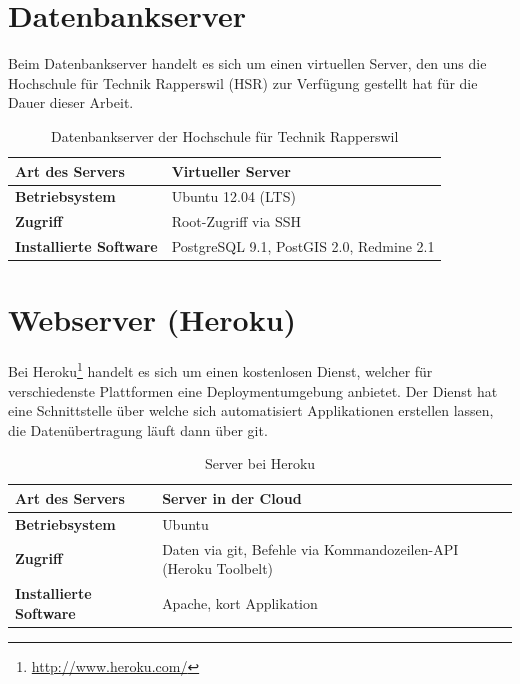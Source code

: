\section{Datenbankserver}

Beim Datenbankserver handelt es sich um einen virtuellen Server, den uns die Hochschule für Technik Rapperswil (HSR) zur Verfügung gestellt hat für die Dauer dieser Arbeit.

\begin{table}[H]
\centering
\begin{tabular}{|p{0.25\twocelltabwidth}|p{0.75\twocelltabwidth}|}
\hline 
\textbf{Art des Servers} & Virtueller Server \\
\hline 
\textbf{Betriebsystem} & Ubuntu 12.04 (LTS) \\
\hline 
\textbf{Zugriff} & Root-Zugriff via SSH \\
\hline 
\textbf{Installierte Software} & PostgreSQL 9.1, PostGIS 2.0, Redmine 2.1 \\
\hline 
\end{tabular} 
\caption{Datenbankserver der Hochschule für Technik Rapperswil}
\label{infrastruktur-datenbankserver-tabelle}
\end{table}

\section{Webserver (Heroku)}

Bei Heroku\footnote{\url{http://www.heroku.com/}} handelt es sich um einen kostenlosen Dienst, welcher für verschiedenste Plattformen eine Deploymentumgebung anbietet. 
Der Dienst hat eine Schnittstelle über welche sich automatisiert Applikationen erstellen lassen, die Datenübertragung läuft dann über \gls{git}.

\begin{table}[H]
\centering
\begin{tabular}{|p{0.25\twocelltabwidth}|p{0.75\twocelltabwidth}|}
\hline 
\textbf{Art des Servers} & Server in der \gls{Cloud} \\
\hline 
\textbf{Betriebsystem} & Ubuntu \\
\hline 
\textbf{Zugriff} & Daten via \gls{git}, Befehle via Kommandozeilen-API (Heroku Toolbelt) \\
\hline 
\textbf{Installierte Software} & Apache, kort Applikation \\
\hline 
\end{tabular} 
\caption{Server bei Heroku}
\label{infrastruktur-heroku-tabelle}
\end{table}

